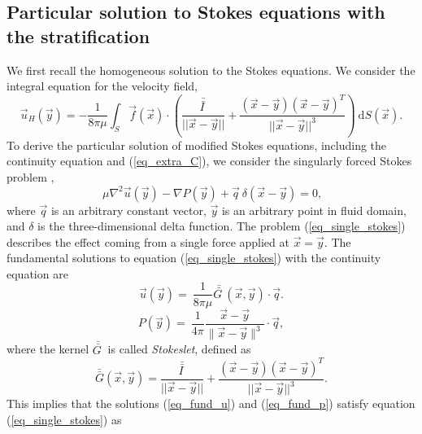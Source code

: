 \subsection{Particular solution to Stokes equations with the stratification}
We first recall the homogeneous solution to the Stokes equations. We consider the integral equation for the velocity field,
\begin{equation}
	\vec{u}_H \left(\vec{y} \right) 
		  = - \frac{1}{8 \pi \mu} \int_{S}  
		 \vec{f}(\vec{x}) 
		 \cdot \left( 
	\frac{\bar{\bar{I \ }}}{||\vec{x}-\vec{y}||} + \frac{(\vec{x}-\vec{y})(\vec{x}-\vec{y})^T}{||\vec{x}-\vec{y}||^3}
		 \right)
		 \ \textrm{d}S(\vec{x}).
\label{eq_slp_homogeneous}
\end{equation} 
To derive the particular solution of modified Stokes equations, including the continuity equation and (\ref{eq_extra_C}), we consider the singularly forced Stokes problem \cite{pozrikidis_boundary_1992},
\begin{equation}
	\ \mu \nabla^2 \vec{u}(\vec{y})
	- \nabla P (\vec{y})
	+\vec{q} \ \delta \left(\vec{x} - \vec{y} \right) =0,
\label{eq_single_stokes}
\end{equation}
where $\vec{q}$ is an arbitrary constant vector, $\vec{y}$ is an arbitrary point in fluid domain, and $\delta$ is the three-dimensional delta function.
The problem (\ref{eq_single_stokes}) 
describes the effect coming from a single force applied at $\vec{x} = \vec{y}.$
The fundamental solutions to equation (\ref{eq_single_stokes}) with the continuity equation are
\begin{equation}
	\vec{u} (\vec{y}) = \ \frac{1}{8\pi \mu}  \bar{\bar{G \ }}(\vec{x}, \vec{y})
	\cdot  \vec{q}.
\label{eq_fund_u}
\end{equation}
\begin{equation}
	P (\vec{y}) = \ \frac{1}{4\pi }  
	\frac{\vec{x} - \vec{y}}{\| \vec{x} - \vec{y}\|^3}
	\cdot  \vec{q},
\label{eq_fund_p}
\end{equation}
where the kernel $\bar{\bar{G \ }}$ is called \textit{Stokeslet}, defined as 
\begin{equation}
	\bar{\bar{G}}( \vec{x}, \vec{y}) = 
	\frac{\bar{\bar{I \ }}}{||\vec{x}-\vec{y} ||} + \frac{(\vec{x}-\vec{y})(\vec{x}-\vec{y})^T}{||\vec{x}-\vec{y} ||^3}.
\end{equation} 
This implies that the solutions (\ref{eq_fund_u}) and (\ref{eq_fund_p}) satisfy equation (\ref{eq_single_stokes}) as
